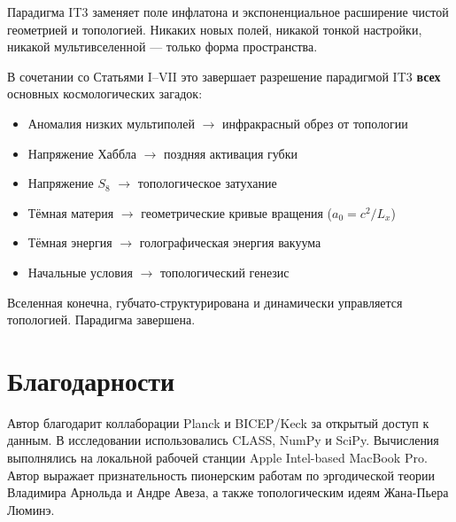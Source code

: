 \documentclass[12pt,a4paper]{article}
\begin{document}
Парадигма IT3 заменяет поле инфлатона и экспоненциальное расширение чистой геометрией и топологией. Никаких новых полей, никакой тонкой настройки, никакой мультивселенной — только форма пространства.

В сочетании со Статьями I–VII это завершает разрешение парадигмой IT3 \textbf{всех} основных космологических загадок:
\begin{itemize}
    \item Аномалия низких мультиполей $\rightarrow$ инфракрасный обрез от топологии
    \item Напряжение Хаббла $\rightarrow$ поздняя активация губки
    \item Напряжение $S_8$ $\rightarrow$ топологическое затухание
    \item Тёмная материя $\rightarrow$ геометрические кривые вращения ($a_0 = c^2/L_x$)
    \item Тёмная энергия $\rightarrow$ голографическая энергия вакуума
    \item Начальные условия $\rightarrow$ топологический генезис
\end{itemize}

Вселенная конечна, губчато-структурирована и динамически управляется топологией. Парадигма завершена.

\section*{Благодарности}

Автор благодарит коллаборации Planck и BICEP/Keck за открытый доступ к данным. В исследовании использовались CLASS, NumPy и SciPy. Вычисления выполнялись на локальной рабочей станции Apple Intel-based MacBook Pro. Автор выражает признательность пионерским работам по эргодической теории Владимира Арнольда и Андре Авеза, а также топологическим идеям Жана-Пьера Люминэ.
\end{document}
